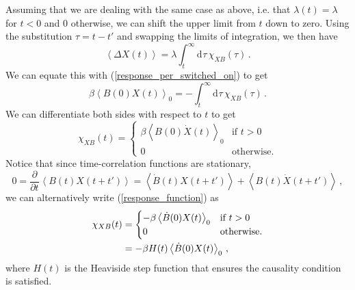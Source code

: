 \documentclass{article}
\theoremstyle{plain}\theoremheaderfont{\normalfont\bfseries}\theorembodyfont{\rmfamily}\theoremseparator{.}\newtheorem*{thm}{Theorem}\newtheorem*{law}{Law}\newtheorem*{pos}{Postulate}
\numberwithin{equation}{section}
\newcommand{\dd}[2][]{\mathrm{d}^{#1} #2\,}
\newcommand{\pdv}[3][]{\frac{\partial^{#1} #2}{{\partial #3}^{#1}}}
\newcommand{\eval}[1]{\left\langle #1 \right\rangle}
\begin{document}
    Assuming that we are dealing with the same case as above, i.e. that \(\lambda(t)=\lambda\) for \(t<0\) and \(0\) otherwise, we can shift the upper limit from \(t\) down to zero. Using the substitution \(\tau=t-t'\) and swapping the limits of integration, we then have
    \begin{equation}\label{observable_int_response}
        \eval{\Delta X(t)}=\lambda\int_{t}^{\infty}\dd{\tau}\chi_{XB}(\tau)\,.
    \end{equation}
    We can equate this with (\ref{response_per_switched_on}) to get
    \begin{equation}
        \beta\eval{B(0)X(t)}_{0}=-\int_{t}^{\infty}\dd{\tau}\chi_{XB}(\tau)\,.
    \end{equation}
    We can differentiate both sides with respect to \(t\) to get
    \begin{equation}\label{response_function}
        \chi_{XB}(t)=\begin{cases}
            \beta\eval{B(0)\dot{X}(t)}_0 & \text{if }t>0 \\
            0 & \text{otherwise.}
        \end{cases}
    \end{equation}
    Notice that since time-correlation functions are stationary,
    \begin{equation}
        0=\pdv{}{t}\eval{B(t)X(t+t')}=\eval{\dot{B}(t)X(t+t')}+\eval{B(t)\dot{X}(t+t')}\,,
    \end{equation}
    we can alternatively write (\ref{response_function}) as
    \begin{align}
        \chi_{XB}(t)&=\begin{cases}
            -\beta\eval{\dot{B}(0)X(t)}_0 & \text{if }t>0 \\
            0 & \text{otherwise.}
        \end{cases}\notag\\
        &=-\beta H(t)\eval{\dot{B}(0)X(t)}_0\,,
    \end{align}
    where \(H(t)\) is the Heaviside step function that ensures the causality condition is satisfied.
\end{document}
